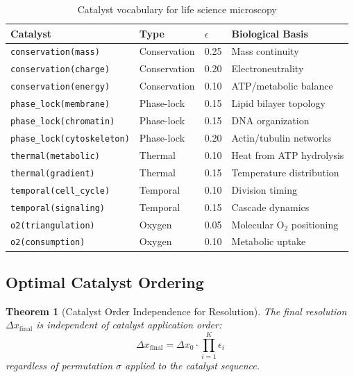 \documentclass[11pt,twocolumn,a4paper]{article}
\newtheorem{theorem}{Theorem}[section]
\theoremstyle{definition}
\theoremstyle{remark}
\begin{document}
\begin{table}[H]
\centering
\caption{Catalyst vocabulary for life science microscopy}
\label{tab:catalysts}
\begin{tabular}{@{}llll@{}}
\toprule
Catalyst & Type & $\epsilon$ & Biological Basis \\
\midrule
\texttt{conservation(mass)} & Conservation & 0.25 & Mass continuity \\
\texttt{conservation(charge)} & Conservation & 0.20 & Electroneutrality \\
\texttt{conservation(energy)} & Conservation & 0.10 & ATP/metabolic balance \\
\texttt{phase\_lock(membrane)} & Phase-lock & 0.15 & Lipid bilayer topology \\
\texttt{phase\_lock(chromatin)} & Phase-lock & 0.15 & DNA organization \\
\texttt{phase\_lock(cytoskeleton)} & Phase-lock & 0.20 & Actin/tubulin networks \\
\texttt{thermal(metabolic)} & Thermal & 0.10 & Heat from ATP hydrolysis \\
\texttt{thermal(gradient)} & Thermal & 0.15 & Temperature distribution \\
\texttt{temporal(cell\_cycle)} & Temporal & 0.10 & Division timing \\
\texttt{temporal(signaling)} & Temporal & 0.15 & Cascade dynamics \\
\texttt{o2(triangulation)} & Oxygen & 0.05 & Molecular O$_2$ positioning \\
\texttt{o2(consumption)} & Oxygen & 0.10 & Metabolic uptake \\
\bottomrule
\end{tabular}
\end{table}

\subsection{Optimal Catalyst Ordering}

\begin{theorem}[Catalyst Order Independence for Resolution]
\label{thm:order_independence}
The final resolution $\Delta x_{\mathrm{final}}$ is independent of catalyst application order:
\begin{equation}
\Delta x_{\mathrm{final}} = \Delta x_0 \cdot \prod_{i=1}^{K} \epsilon_i
\end{equation}
regardless of permutation $\sigma$ applied to the catalyst sequence.
\end{theorem}
\end{document}
